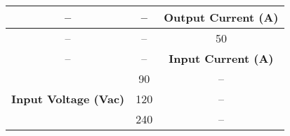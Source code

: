 \begin{tabular}{|c|c|c|}
\hline
-- & -- & \textbf{Output Current (A)} \\
\hline
-- & -- & 50 \\
-- & -- & \textbf{Input Current (A)} \\
\hline
\multirow{3}{*}{\textbf{Input Voltage (Vac)}} & 90 & -- \\
 & 120 & -- \\
 & 240 & -- \\
\hline
\end{tabular}